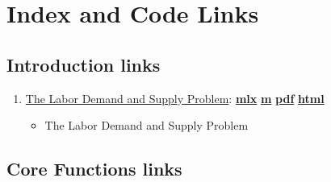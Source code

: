 \documentclass[
]{book}
\providecommand{\tightlist}{%
  \setlength{\itemsep}{0pt}\setlength{\parskip}{0pt}}
\begin{document}
\hypertarget{appendix-appendix}{%
\appendix}


\hypertarget{index-and-code-links}{%
\chapter{Index and Code Links}\label{index-and-code-links}}

\hypertarget{introduction-links}{%
\section{Introduction links}\label{introduction-links}}

\begin{enumerate}
\def\labelenumi{\arabic{enumi}.}
\tightlist
\item
  \href{https://fanwangecon.github.io/PrjLabEquiBFW/PrjLabEquiBFW/doc/intro/htmlpdfm/bfwx_intro.html}{The Labor Demand and Supply Problem}: \href{https://github.com/FanWangEcon/PrjLabEquiBFW/blob/master/PrjLabEquiBFW/doc/intro/bfwx_intro.mlx}{\textbf{mlx}} \textbar{} \href{https://github.com/FanWangEcon/PrjLabEquiBFW/blob/master/PrjLabEquiBFW/doc/intro/htmlpdfm/bfwx_intro.m}{\textbf{m}} \textbar{} \href{https://github.com/FanWangEcon/PrjLabEquiBFW/blob/master/PrjLabEquiBFW/doc/intro/htmlpdfm/bfwx_intro.pdf}{\textbf{pdf}} \textbar{} \href{https://fanwangecon.github.io/PrjLabEquiBFW/PrjLabEquiBFW/doc/intro/htmlpdfm/bfwx_intro.html}{\textbf{html}}

  \begin{itemize}
  \tightlist
  \item
    The Labor Demand and Supply Problem
  \end{itemize}
\end{enumerate}

\hypertarget{core-functions-links}{%
\section{Core Functions links}\label{core-functions-links}}
\end{document}
